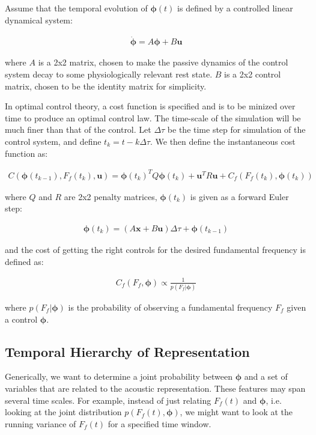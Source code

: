 \documentclass{article} %
\begin{document}
Assume that the temporal evolution of $\bm{\phi}(t)$ is defined by a controlled linear dynamical
system:

\begin{align*}
\dot{\bm{\phi}}=A\bm{\phi} + B\bm{u}
\end{align*}

where $A$ is a 2x2 matrix, chosen to make the passive dynamics of the control system decay
to some physiologically relevant rest state. $B$ is a 2x2 control matrix, chosen to be the
identity matrix for simplicity.

In optimal control theory, a cost function is specified and is to be minized over time to
produce an optimal control law. The time-scale of the simulation will be much finer than
that of the control. Let $\Delta\tau$ be the time step for simulation of the control system,
and define $t_k = t - k\Delta\tau$. We then define the instantaneous cost function as:

\begin{align*}
C \left( \bm{\phi}(t_{k-1}), F_f(t_k), \bm{u} \right) = \bm{\phi}(t_k)^T Q \bm{\phi}(t_k) + \bm{u}^T R \bm{u} + C_f(F_f(t_k), \bm{\phi}(t_k))
\end{align*}

where $Q$ and $R$ are 2x2 penalty matrices, $\bm{\phi}(t_k)$ is given as a forward Euler step:

\begin{align*}
\bm{\phi}(t_k) = \left( A\bm{x} + B\bm{u} \right) \Delta\tau + \bm{\phi}(t_{k-1})
\end{align*}

and the cost of getting the right controls for the desired fundamental frequency is defined as:

\begin{align*}
C_f(F_f, \bm{\phi}) \propto \frac{1}{p \left( F_f | \bm{\phi} \right) }
\end{align*}

where $p \left( F_f | \bm{\phi} \right)$ is the probability of observing a fundamental frequency $F_f$
given a control $\bm{\phi}$.

\subsection{Temporal Hierarchy of Representation}

Generically, we want to determine a joint probability between $\bm{\phi}$ and a set of
variables that are related to the acoustic representation. These features may span several
time scales. For example, instead of just relating $F_f(t)$ and $\bm{\phi}$, i.e. looking
at the joint distribution $p \left( F_f(t), \bm{\phi} \right)$, we might want to look
at the running variance of $F_f(t)$ for a specified time window.
\end{document}
